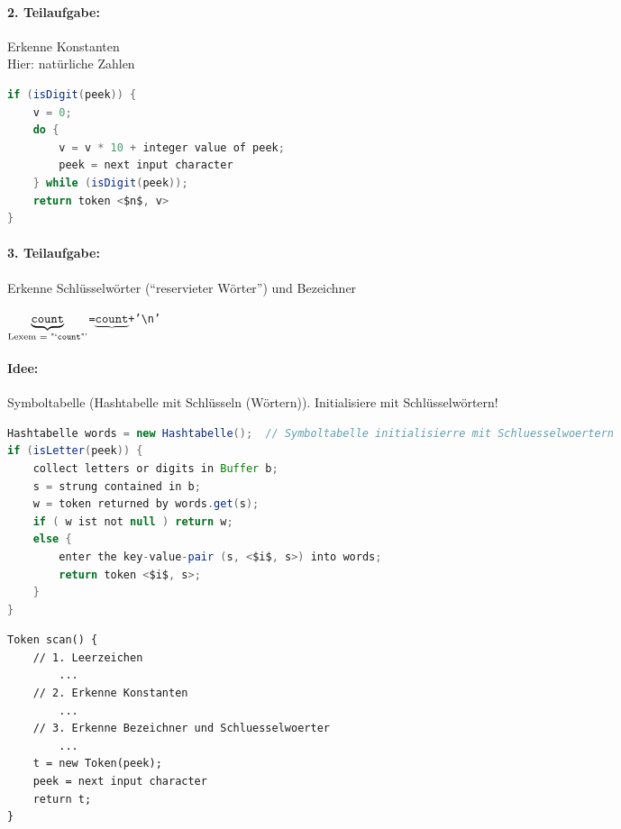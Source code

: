 \paragraph{2. Teilaufgabe:} Erkenne Konstanten\\
Hier: natürliche Zahlen
\begin{lstlisting}[language=Java,mathescape=True]
if (isDigit(peek)) {
    v = 0;
    do {
        v = v * 10 + integer value of peek;
        peek = next input character
    } while (isDigit(peek));
    return token <$n$, v>
}
\end{lstlisting}

\paragraph{3. Teilaufgabe:} Erkenne Schlüsselwörter ("`reservieter Wörter"') und Bezeichner
\begin{center}
\texttt{\dq\textvisiblespace\textvisiblespace\textvisiblespace  $\underbrace{\texttt{count}}_{\text{Lexem = "`\texttt{count}"'}}$\textvisiblespace\textvisiblespace=\textvisiblespace $\underbrace{\texttt{count}}$\textvisiblespace +'\textbackslash n'\dq}
\end{center}
\paragraph{Idee:} Symboltabelle (Hashtabelle mit Schlüsseln (Wörtern)). Initialisiere mit Schlüsselwörtern!
\begin{lstlisting}[language=Java,mathescape=True]
Hashtabelle words = new Hashtabelle();  // Symboltabelle initialisierre mit Schluesselwoertern
if (isLetter(peek)) {
    collect letters or digits in Buffer b;
    s = strung contained in b;
    w = token returned by words.get(s);
    if ( w ist not null ) return w;
    else {
        enter the key-value-pair (s, <$i$, s>) into words;
        return token <$i$, s>;
    }
}
\end{lstlisting}
\begin{lstlisting}
Token scan() {
    // 1. Leerzeichen
        ...
    // 2. Erkenne Konstanten
        ...
    // 3. Erkenne Bezeichner und Schluesselwoerter
        ...
    t = new Token(peek);
    peek = next input character
    return t;
}
\end{lstlisting}
